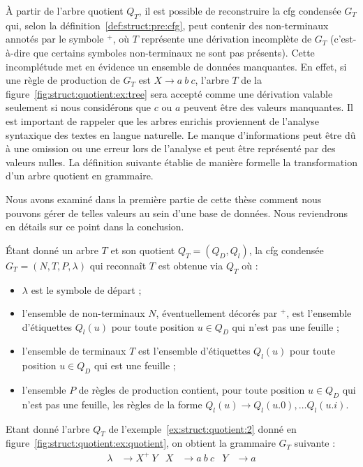 À partir de l'arbre quotient $Q_T$, il est possible de reconstruire la \gls{cfg} condensée $G_T$ qui, selon la définition~\ref{def:struct:pre:cfg}, peut contenir des non-terminaux annotés par le symbole ${}^+$, où $T$ représente une dérivation incomplète de $G_T$ (c'est-à-dire que certains symboles non-terminaux ne sont pas présents).
Cette incomplétude met en évidence un ensemble de données manquantes.
En effet, si une règle de production de $G_T$ est $X \to a~b~c$, l'arbre $T$ de la figure~\ref{fig:struct:quotient:ex:tree} sera accepté comme une dérivation valable seulement si nous considérons que $c$ ou $a$ peuvent être des valeurs manquantes.
Il est important de rappeler que les arbres enrichis proviennent de l'analyse syntaxique des textes en langue naturelle.
Le manque d'informations peut être dû à une omission ou une erreur lors de l'analyse et peut être représenté par des valeurs nulles.
La définition suivante établie de manière formelle la transformation d'un arbre quotient en grammaire.

\begin{remark}
    Nous avons examiné dans la première partie de cette thèse comment nous pouvons gérer de telles valeurs au sein d'une base de données.
    Nous reviendrons en détails sur ce point dans la conclusion.
\end{remark}

\begin{definition}
    Étant donné un arbre $T$ et son quotient $Q_T = (Q_D, Q_l)$, la \gls{cfg} condensée $G_T = (N, T, P, \lambda)$ qui reconnaît $T$ est obtenue via $Q_T$ où :
    \begin{itemize}
        \item $\lambda$ est le symbole de départ ;
        \item l'ensemble de non-terminaux $N$, éventuellement décorés par ${}^+$, est l'ensemble d'étiquettes $Q_l(u)$ pour toute position $u \in Q_D$ qui n'est pas une feuille ;
        \item l'ensemble de terminaux $T$ est l'ensemble d'étiquettes $Q_l(u)$ pour toute position $u \in Q_D$ qui est une feuille ;
        \item l'ensemble $P$ de règles de production contient, pour toute position $u \in Q_D$ qui n'est pas une feuille, les règles de la forme $Q_l(u) \to Q_l(u.0), \dots Q_l(u.i)$.
    \end{itemize}
\end{definition}

\begin{example}
    \label{ex:struct:quotient:3}
    Etant donné l'arbre $Q_T$ de l'exemple~\ref{ex:struct:quotient:2} donné en figure~\ref{fig:struct:quotient:ex:quotient}, on obtient la grammaire $G_T$ suivante :
    \begin{align*}
        \lambda & \to X^+ ~ Y & X & \to a ~ b ~ c & Y & \to a
    \end{align*}
\end{example}

